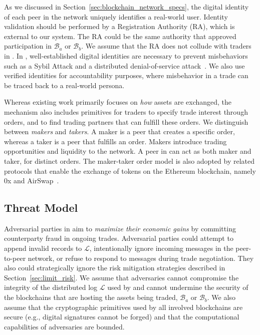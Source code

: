 As we discussed in Section~\ref{sec:blockchain_network_specs}, the digital identity of each peer in the \ModelName{} network uniquely identifies a real-world user.
Identity validation should be performed by a Registration Authority (RA), which is external to our system.
The RA could be the same authority that approved participation in $ \mathcal{B}_a $ or $ \mathcal{B}_b $.
We assume that the RA does not collude with traders in \ModelName{}.
In \ModelName{}, well-established digital identities are necessary to prevent misbehaviors such as a Sybil Attack and a distributed denial-of-service attack~\cite{douceur2002sybil,Specht2004DistributedDO}.
We also use verified identities for accountability purposes, where misbehavior in a trade can be traced back to a real-world persona.

Whereas existing work primarily focuses on \emph{how} assets are exchanged, the \ModelName{} mechanism also includes primitives for traders to specify trade interest through orders, and to find trading partners that can fulfill these orders.
We distinguish between \emph{makers} and \emph{takers}.
A maker is a peer that creates a specific order, whereas a taker is a peer that fulfills an order.
Makers introduce trading opportunities and liquidity to the \ModelName{} network.
A peer in \ModelName{} can act as both maker and taker, for distinct orders.
The maker-taker order model is also adopted by related protocols that enable the exchange of tokens on the Ethereum blockchain, namely 0x and AirSwap~\cite{warren20170x,airswap}.

\subsection{Threat Model}
Adversarial parties in \ModelName{} aim to \emph{maximize their economic gains} by committing counterparty fraud in ongoing trades.
Adversarial parties could attempt to append invalid records to $ \mathcal{L} $, intentionally ignore incoming messages in the peer-to-peer network, or refuse to respond to messages during trade negotiation.
They also could strategically ignore the risk mitigation strategies described in Section~\ref{sec:limit_risk}.
We assume that adversaries cannot compromise the integrity of the distributed log $ \mathcal{L} $ used by \ModelName{} and cannot undermine the security of the blockchains that are hosting the assets being traded, $ \mathcal{B}_a $ or $ \mathcal{B}_b $.
We also assume that the cryptographic primitives used by all involved blockchains are secure (e.g., digital signatures cannot be forged) and that the computational capabilities of adversaries are bounded.

